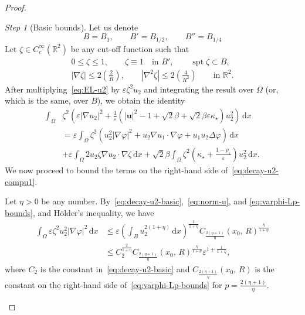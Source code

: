 \documentclass[a4paper, 11pt, twoside, leqno]{article}
\theoremstyle{definition}              %
\theoremstyle{remark}                  %
\newtheorem{step}{Step}
\DeclareMathOperator{\spt}{spt}                                     %
\newcommand{\abs}[1]{\left| #1 \right|}                             %
\renewcommand{\d}{\mathrm{d}}
\newcommand{\R}{\mathbb{R}}
\renewcommand{\u}{\mathbf{u}}
\newcommand{\eps}{\varepsilon}
\begin{document}
\begin{proof}
 \setcounter{step}{0}
\begin{step}[Basic bounds]\label{step:u2-basic-bounds}
    Let us denote
    \[
        B = B_1, \qquad B' = B_{1/2}, \qquad B'' = B_{1/4}
    \]
    Let $\zeta \in C^\infty_c(\R^2)$ be any cut-off function such that
    \begin{gather}
        0 \leq \zeta \leq 1, \qquad 
        \zeta \equiv 1 \quad \mbox{in } B', \qquad 
        \spt\zeta \subset B, \label{eq:cut-off} \\ 
        \abs{\nabla \zeta} \leq 2\left(\frac{2}{R}\right), \qquad \abs{\nabla^2 \zeta} \leq 2\left(\frac{4}{R^2}\right) \qquad \mbox{in } \R^2. \label{eq:cut-off-grad}
    \end{gather}
    After multiplying~\eqref{eq:EL-u2} by $\eps \zeta^2 u_2$ and 
    integrating the result over $\Omega$ (or, which is the same, over $B$), 
    we obtain the identity
    \begin{equation}\label{eq:decay-u2-compu1}
    \begin{split}
        \int_\Omega & \zeta^2 \left( \eps \abs{\nabla u_2}^2 + \frac{1}{\eps} \left( \abs{\u}^2 - 1 + \sqrt{2}\beta + \sqrt{2}\beta \eps \kappa_\star \right) u_2^2 \right)\,{\d}x \\
        &= 
        \eps \int_\Omega \zeta^2 \left( u_2^2 \abs{\nabla \varphi}^2 + u_2 \nabla u_1 \cdot \nabla \varphi + u_1 u_2 \Delta \varphi \right) \,{\d}x \\
        &+ \eps \int_\Omega 2 u_2 \zeta \nabla u_2 \cdot \nabla \zeta \,{\d}x 
        + \sqrt{2}\beta \int_\Omega \zeta^2 \left(\kappa_\star + \frac{1 -\rho_\eps}{\eps} \right) u_2^2\,{\d}x.
    \end{split}
    \end{equation}
    We now proceed to bound the terms on the right-hand side 
    of~\eqref{eq:decay-u2-compu1}. 

    Let $\eta > 0$ be any number. 
    By~\eqref{eq:decay-u2-basic},~\eqref{eq:norm-u}, and  \eqref{eq:varphi-Lp-bounds}, and H\"{o}lder's inequality, we have 
    \begin{equation}\label{eq:decay-u2-compu2}
    \begin{split}
        \int_\Omega \eps \zeta^2 u_2^2 \abs{\nabla \varphi}^2\,{\d}x 
        &\leq \eps\left( \int_B u_2^{2(1+\eta)}\,{\d}x \right)^{\frac{1}{1+\eta}} C_{\frac{2(\eta+1)}{\eta}}(x_0,\,R)^{\frac{\eta}{1+\eta}} \\
        &\leq C_2^{\frac{2}{1+\eta}} C_{\frac{2(\eta+1)}{\eta}}(x_0,\,R)^{\frac{\eta}{1+\eta}} \eps^{1+\frac{1}{1+\eta}},
    \end{split}
    \end{equation} 
    where $C_2$ is the constant in~\eqref{eq:decay-u2-basic} and 
    $C_{\frac{2(\eta+1)}{\eta}}(x_0,\,R)$ is the constant on the 
    right-hand side of~\eqref{eq:varphi-Lp-bounds} for $p = \frac{2(\eta+1)}{\eta}$. 
    

\end{step}
\end{proof}
\end{document}
